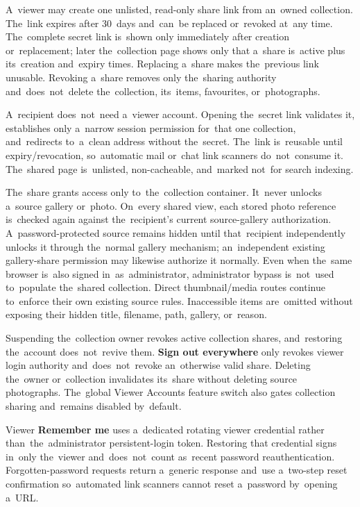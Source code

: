 \documentclass[11pt,a4paper]{article}
\newcommand{\ui}[1]{\textbf{#1}}
\begin{document}
A~viewer may create one unlisted, read-only share link from an~owned collection.
The~link expires after 30~days and~can~be replaced or~revoked at~any time.
The~complete secret link is~shown only immediately after creation
or~replacement; later the~collection page shows only that a~share is~active plus
its~creation and~expiry times. Replacing a~share makes the~previous link
unusable. Revoking a~share removes only the~sharing authority
and~does~not~delete the~collection, its~items, favourites, or~photographs.

A~recipient does~not~need a~viewer account. Opening the~secret link validates
it, establishes only a~narrow session permission for~that one collection,
and~redirects to~a~clean address without the~secret. The~link is~reusable until
expiry/revocation, so~automatic mail or~chat link scanners do~not~consume it.
The~shared page is~unlisted, non-cacheable, and~marked not~for search indexing.

The~share grants access only to~the~collection container. It~never unlocks
a~source gallery or~photo. On~every shared view, each stored photo reference
is~checked again against the~recipient's current source-gallery authorization.
A~password-protected source remains hidden until that~recipient independently
unlocks it through the~normal gallery mechanism; an~independent existing
gallery-share permission may likewise authorize it normally. Even when the~same
browser is~also signed in~as~administrator, administrator bypass is~not~used
to~populate the~shared collection. Direct thumbnail/media routes continue
to~enforce their own existing source rules. Inaccessible items are~omitted
without exposing their hidden title, filename, path, gallery, or~reason.

Suspending the~collection owner revokes active collection shares, and~restoring
the~account does~not~revive them. \ui{Sign out everywhere} only revokes viewer
login authority and~does~not~revoke an~otherwise valid share. Deleting the~owner
or~collection invalidates its~share without deleting source photographs.
The~global Viewer Accounts feature switch also gates collection sharing
and~remains disabled by~default.

Viewer \ui{Remember me} uses a~dedicated rotating viewer credential rather
than~the~administrator persistent-login token. Restoring that credential signs
in~only the~viewer and~does~not~count as~recent password reauthentication.
Forgotten-password requests return a~generic response and~use a~two-step reset
confirmation so~automated link scanners cannot reset a~password by~opening
a~URL.
\end{document}
